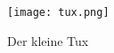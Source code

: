 \documentclass{article}
\begin{document}
\begin{figure}[h]
\begin{center}
	\texttt{[image: tux.png]}
\caption{Der kleine Tux}
\label{img:kleinertux}
\end{center}
\end{figure}
\end{document}
